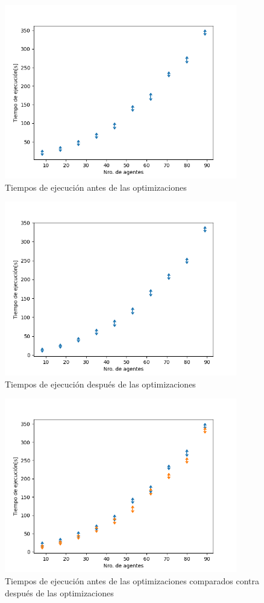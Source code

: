 \documentclass{article}
\begin{document}
\begin{figure}[h]
\begin{center}
\includegraphics[width=4in]{./images/Antes.png} 
\caption{Tiempos de ejecución antes de las optimizaciones}
\label{fig1}
\end{center}
\end{figure}

\begin{figure}[h]
\begin{center}
\includegraphics[width=4in]{./images/Despues.png}
\caption{Tiempos de ejecución después de las optimizaciones}
\label{fig2}
\end{center}
\end{figure}

\begin{figure}[h]
\begin{center}
\includegraphics[width=4in]{./images/AntesVSDespues.png}
\caption{Tiempos de ejecución antes de las optimizaciones comparados contra después de las optimizaciones}
\label{fig3}
\end{center}
\end{figure}
\end{document}
